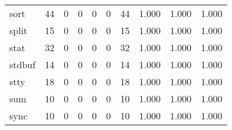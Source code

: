 \begin{longtable}{lp{2.0cm}p{2.0cm}p{2.0cm}p{2.0cm}p{2.0cm}p{2.0cm}p{2.0cm}p{2.0cm}p{2.0cm}}
sort      &                     44 &                                             0 &                                            0 &                                           0 &                                            0 &                                         44 &                                1.000 &                                  1.000 &                                1.000 \\
split     &                     15 &                                             0 &                                            0 &                                           0 &                                            0 &                                         15 &                                1.000 &                                  1.000 &                                1.000 \\
stat      &                     32 &                                             0 &                                            0 &                                           0 &                                            0 &                                         32 &                                1.000 &                                  1.000 &                                1.000 \\
stdbuf    &                     14 &                                             0 &                                            0 &                                           0 &                                            0 &                                         14 &                                1.000 &                                  1.000 &                                1.000 \\
stty      &                     18 &                                             0 &                                            0 &                                           0 &                                            0 &                                         18 &                                1.000 &                                  1.000 &                                1.000 \\
sum       &                     10 &                                             0 &                                            0 &                                           0 &                                            0 &                                         10 &                                1.000 &                                  1.000 &                                1.000 \\
sync      &                     10 &                                             0 &                                            0 &                                           0 &                                            0 &                                         10 &                                1.000 &                                  1.000 &                                1.000 \\

\end{longtable}
